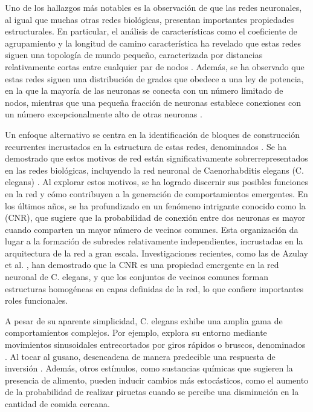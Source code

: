 Uno de los hallazgos más notables es la observación de que las redes neuronales, al igual que muchas otras redes biológicas, presentan importantes propiedades estructurales. En particular, el análisis de características como el coeficiente de agrupamiento y la longitud de camino característica ha revelado que estas redes siguen una topología de mundo pequeño, caracterizada por distancias relativamente cortas entre cualquier par de nodos \cite{heuvel_comparative_2016}. Además, se ha observado que estas redes siguen una distribución de grados que obedece a una ley de potencia, en la que la mayoría de las neuronas se conecta con un número limitado de nodos, mientras que una pequeña fracción de neuronas establece conexiones con un número excepcionalmente alto de otras neuronas \cite{varshney_structural_2011}.

Un enfoque alternativo se centra en la identificación de bloques de construcción recurrentes incrustados en la estructura de estas redes, denominados . Se ha demostrado que estos motivos de red están significativamente sobrerrepresentados en las redes biológicas, incluyendo la red neuronal de Caenorhabditis elegans (C. elegans) \cite{milo_network_2002}. Al explorar estos motivos, se ha logrado discernir sus posibles funciones en la red y cómo contribuyen a la generación de comportamientos emergentes. En los últimos años, se ha profundizado en un fenómeno intrigante conocido como la  (CNR), que sugiere que la probabilidad de conexión entre dos neuronas es mayor cuando comparten un mayor número de vecinos comunes. Esta organización da lugar a la formación de subredes relativamente independientes, incrustadas en la arquitectura de la red a gran escala. Investigaciones recientes, como las de Azulay et al. \cite{azulay_c_2016}, han demostrado que la CNR es una propiedad emergente en la red neuronal de C. elegans, y que los conjuntos de vecinos comunes forman estructuras homogéneas en capas definidas de la red, lo que confiere importantes roles funcionales.



A pesar de su aparente simplicidad, C. elegans exhibe una amplia gama de comportamientos complejos. Por ejemplo, explora su entorno mediante movimientos sinusoidales entrecortados por giros rápidos o bruscos, denominados . Al tocar al gusano, desencadena de manera predecible una respuesta de inversión \cite{bono_neuronal_2005}. Además, otros estímulos, como sustancias químicas que sugieren la presencia de alimento, pueden inducir cambios más estocásticos, como el aumento de la probabilidad de realizar piruetas cuando se percibe una disminución en la cantidad de comida cercana.


